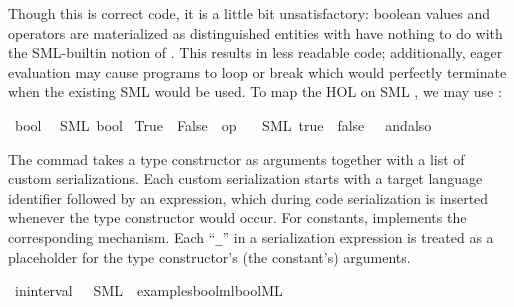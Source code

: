 \begin{isabellebody}
\begin{isamarkuptext}
  \noindent Though this is correct code, it is a little bit unsatisfactory:
  boolean values and operators are materialized as distinguished
  entities with have nothing to do with the SML-builtin notion
  of .  This results in less readable code;
  additionally, eager evaluation may cause programs to
  loop or break which would perfectly terminate when
  the existing SML  would be used.  To map
  the HOL  on SML , we may use
  :%
\end{isamarkuptext}%
\isamarkuptrue%
%
\isadelimtt
%
\endisadelimtt
%
\isatagtt
{}\isamarkupfalse%
\ bool\isanewline
\ \ {\isacharparenleft}SML\ {\isachardoublequoteopen}bool{\isachardoublequoteclose}{\isacharparenright}\isanewline
{}\isamarkupfalse%
\ True\ \ False\ \ {\isachardoublequoteopen}op\ {\isasymand}{\isachardoublequoteclose}\isanewline
\ \ {\isacharparenleft}SML\ {\isachardoublequoteopen}true{\isachardoublequoteclose}\ \ {\isachardoublequoteopen}false{\isachardoublequoteclose}\ \ {\isachardoublequoteopen}{\isacharunderscore}\ andalso\ {\isacharunderscore}{\isachardoublequoteclose}{\isacharparenright}%
\endisatagtt
{\isafoldtt}%
%
\isadelimtt
%
\endisadelimtt
%
\begin{isamarkuptext}%
The \isa{{\isasymCODETYPE}} commad takes a type constructor
  as arguments together with a list of custom serializations.
  Each custom serialization starts with a target language
  identifier followed by an expression, which during
  code serialization is inserted whenever the type constructor
  would occur.  For constants, \isa{{\isasymCODECONST}} implements
  the corresponding mechanism.  Each ``\verb|_|'' in
  a serialization expression is treated as a placeholder
  for the type constructor's (the constant's) arguments.%
\end{isamarkuptext}%
\isamarkuptrue%
\isamarkupfalse%
\ in{\isacharunderscore}interval\ \ \ SML\ \ {\isachardoublequoteopen}examples{\isacharslash}bool{\isacharunderscore}mlbool{\isachardot}ML{\isachardoublequoteclose}%
\begin{isamarkuptext}%


\end{isamarkuptext}
\end{isabellebody}
